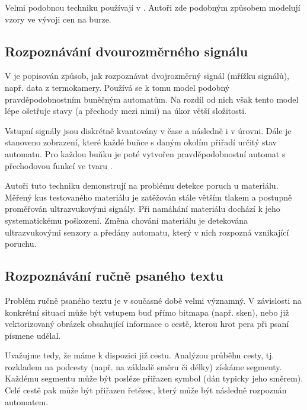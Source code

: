 \documentclass[a4paper,10pt]{article}
\begin{document}
Velmi podobnou techniku používají v \cite{ManPra-PriPatDetUsFiStMaFuzTra}. Autoři zde podobným způsobem modelují vzory ve vývoji cen na burze.

\subsection{Rozpoznávání dvourozměrného signálu}
V \cite{Jin+-WavBasFeaExtUsPrFiStAuPatCla} je popisován způsob, jak rozpoznávat dvojrozměrný signál (mřížku signálů), např. data z termokamery. Používá se k tomu model podobný pravděpodobnostním buněčným automatům. Na rozdíl od nich však tento model lépe ošetřuje stavy (a přechody mezi nimi) na úkor větší složitosti.

Vstupní signály jsou diskrétně kvantovány v čase a následně i v úrovni. Dále je stanoveno zobrazení, které každé buňce s daným okolím přiřadí určitý stav automatu. Pro každou buňku je poté vytvořen pravděpodobnostní automat s přechodovou funkcí ve tvaru .

Autoři tuto techniku demonstrují na problému detekce poruch u materiálu. Měřený kus testovaného materiálu je zatěžován stále větším tlakem a postupně proměřován ultrazvukovými signály. Při namáhání materiálu dochází k jeho systematickému poškození. Změna chování materiálu je detekována ultrazvukovými senzory a předány automatu, který v nich rozpozná vznikající poruchu.

\subsection{Rozpoznávání ručně psaného textu} \label{subs:RecHandWrit}
Problém ručně psaného textu je v současné době velmi významný. V závislosti na konkrétní situaci může být vstupem buď přímo bitmapa (např. sken), nebo již vektorizovaný obrázek obsahující informace o cestě, kterou hrot pera při psaní písmene udělal.

Uvažujme tedy, že máme k dispozici již cestu. Analýzou průběhu cesty, tj. rozkladem na podcesty (např. na základě směru či délky) získáme segmenty. Každému segmentu může být posléze přiřazen symbol (dán typicky jeho směrem). Celé cestě pak může být přiřazen řetězec, který může být následně rozpoznán automatem.
\end{document}
